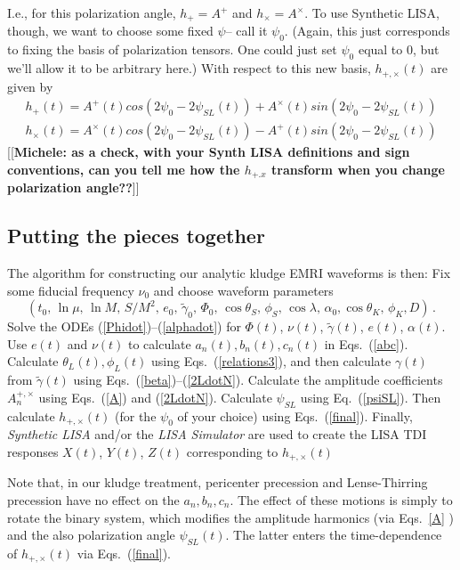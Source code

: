 \documentclass[11pt]{report}
\def\be{\begin{equation}}
\def\ee{\end{equation}}
\begin{document}
I.e., for this polarization angle, $h_+ = A^+$  and  $h_{\times} = 
A^{\times}$.
To use Synthetic LISA, though, we want to choose some fixed $\psi$-- call it $\psi_0$. 
(Again, this just  corresponds to fixing the basis of polarization tensors.  One could just 
set $\psi_0$ equal to $0$, but we'll allow it to be arbitrary here.) With respect to this new
basis, $h_{+,\times}(t)$ are given by
\begin{eqnarray}\label{final}
h_+(t) = A^+(t) cos(2\psi_0 - 2\psi_{SL}(t) ) + A^{\times}(t) sin(2\psi_0 - 2\psi_{SL}(t) ) \nonumber \\
h_{\times}(t) = A^{\times}(t) cos(2\psi_0 - 2\psi_{SL}(t) ) - A^+(t) sin(2\psi_0 - 2\psi_{SL}(t) )
\end{eqnarray}
[[{\bf Michele:  as a check, with your Synth LISA definitions and sign conventions, can you tell me how the $h_{+.x}$ transform when
you change polarization angle??}]] 

\subsection{Putting the pieces together}

The algorithm for constructing our analytic kludge EMRI waveforms is then:
Fix some fiducial frequency $\nu_0$ and choose waveform parameters
\be
(t_0,\,\ln\mu,\,\ln M,\,S/M^2,\,e_0,\,\tilde\gamma_0,\,\Phi_0,\,\cos\theta_S,\,
\phi_S,\,\cos\lambda,\,\alpha_0,\cos\theta_K,\,\phi_K,D) \, .
\ee
Solve the ODEs (\ref{Phidot})--(\ref{alphadot})
for $\Phi(t)$, $\nu(t)$, $\tilde\gamma(t)$, $e(t)$, $\alpha(t)$.
Use $e(t)$ and $\nu(t)$ to
calculate $a_n(t), b_n(t), c_n(t)$ in Eqs.~(\ref{abc}).
Calculate $\theta_L(t),\phi_L(t)$ using Eqs.~(\ref{relations3}), and then
calculate $\gamma(t)$ from $\tilde\gamma(t)$ using Eqs.~(\ref{beta})--(\ref{2LdotN}).
Calculate the amplitude coefficients $A_n^{+,\times}$  using Eqs.~(\ref{A}) and (\ref{2LdotN}).
Calculate $\psi_{SL}$ using Eq.~(\ref{psiSL}).
Then calculate $h_{+,\times}(t)$ (for the $\psi_0$ of your choice) using
Eqs.~(\ref{final}).   Finally, {\it Synthetic LISA} and/or the {\it LISA Simulator} are 
used to create the LISA TDI responses $X(t)$, $Y(t)$, $Z(t)$  corresponding to $h_{+,\times}(t)$ 

Note that, in our kludge treatment, pericenter precession and Lense-Thirring
precession have no effect on the $a_n, b_n, c_n$.  The effect of these motions is simply to
rotate the binary system, which modifies the amplitude harmonics (via Eqs.~\ref{A} ) and the 
also polarization angle $\psi_{SL}(t)$. The latter enters the time-dependence of
$h_{+,\times}(t)$ via Eqs.~(\ref{final}). 
\end{document}
